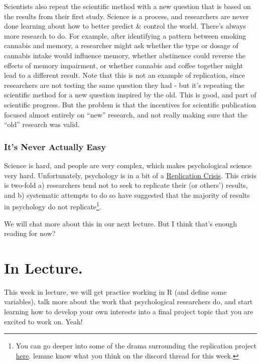\documentclass[
  letterpaper,
  DIV=11,
  numbers=noendperiod,
  oneside]{scrreprt}
\begin{document}
Scientists also repeat the scientific method with a new question that is
based on the results from their first study. Science is a process, and
researchers are never done learning about how to better predict \&
control the world. There's always more research to do. For example,
after identifying a pattern between smoking cannabis and memory, a
researcher might ask whether the type or dosage of cannabis intake would
influence memory, whether abstinence could reverse the effects of memory
impairment, or whether cannabis and coffee together might lead to a
different result. Note that this is not an example of replication, since
researchers are not testing the same question they had - but it's
repeating the scientific method for a new question inspired by the old.
This is good, and part of scientific progress. But the problem is that
the incentives for scientific publication focused almost entirely on
``new'' research, and not really making sure that the ``old'' research
was valid.

\subsection{It's Never Actually Easy}\label{its-never-actually-easy}

Science is hard, and people are very complex, which makes psychological
science very hard. Unfortunately, psychology is in a bit of a
\href{https://www.vox.com/future-perfect/21504366/science-replication-crisis-peer-review-statistics}{Replication
Crisis}. This crisis is two-fold a) researchers tend not to seek to
replicate their (or others') results, and b) systematic attempts to do
so have suggested that the majority of results in psychology do not
replicate\footnote{You can go deeper into some of the drama surrounding
  the replication project \hyperref[0]{here}. lemme know what you think
  on the discord thread for this week.}.

We will chat more about this in our next lecture. But I think that's
enough reading for now?

\chapter{In Lecture.}\label{in-lecture.}

This week in lecture, we will get practice working in R (and define some
variables), talk more about the work that psychological researchers do,
and start learning how to develop your own interests into a final
project topic that you are excited to work on. Yeah!
\end{document}

